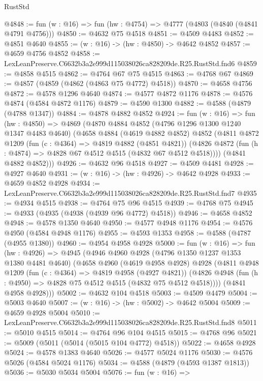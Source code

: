 \begin{lexlean}{RustStd}
\begin{coremodule}
@4848 := fun (w : @16) => fun (hw : @4754) => @4777 (@4803 (@4840 (@4841 @4791 @4756)))
@4850 := @4632 @75 @4518
@4851 := @4509 @4483
@4852 := @4851 @4640
@4855 := (w : @16) -> (hw : @4850) -> @4642 @4852
@4857 := @4659 @4756 @4852
@4858 := LexLeanPreserve.C6632b3a2e999d115038026ca828209de.R25.RustStd.fnd6
@4859 := @4858 @4515
@4862 := @4764 @67 @75 @4515
@4863 := @4768 @67
@4869 := @4857 (@4859 (@4862 (@4863 @75 @4772) @4518))
@4870 := @4658 @4756
@4872 := @4578 @1296 @4640
@4874 := @4577 @4872 @1176
@4878 := @4576 @4874 (@4584 @4872 @1176)
@4879 := @4590 @1300
@4882 := @4588 (@4879 (@4788 @1347))
@4884 := @4878 @4882 @4852
@4924 := fun (w : @16) =>
  fun (hw : @4850) =>
  @4869
    (@4870
      @4884
      @4852
      (@4796 @1296 @1300 @1240 @1347 @4483 @4640)
      (@4658
        @4884
        (@4619 @4882 @4852)
        @4852
        (@4811
          @4872
          @1209
          (fun (c : @4364) => @4819 @4882 (@4851 @4821))
          (@4826 @4872 (fun (h : @4874) => @4828 @67 @4512 @4515 (@4832 @67 @4512 @4518))))
        (@4841 @4882 @4852)))
@4926 := @4632 @96 @4518
@4927 := @4509 @4481
@4928 := @4927 @4640
@4931 := (w : @16) -> (hw : @4926) -> @4642 @4928
@4933 := @4659 @4852 @4928
@4934 := LexLeanPreserve.C6632b3a2e999d115038026ca828209de.R25.RustStd.fnd7
@4935 := @4934 @4515
@4938 := @4764 @75 @96 @4515
@4939 := @4768 @75
@4945 := @4933 (@4935 (@4938 (@4939 @96 @4772) @4518))
@4946 := @4658 @4852
@4948 := @4578 @1350 @4640
@4950 := @4577 @4948 @1176
@4954 := @4576 @4950 (@4584 @4948 @1176)
@4955 := @4593 @1353
@4958 := @4588 (@4787 (@4955 @1380))
@4960 := @4954 @4958 @4928
@5000 := fun (w : @16) =>
  fun (hw : @4926) =>
  @4945
    (@4946
      @4960
      @4928
      (@4796 @1350 @1237 @1353 @1380 @4481 @4640)
      (@4658
        @4960
        (@4619 @4958 @4928)
        @4928
        (@4811
          @4948
          @1209
          (fun (c : @4364) => @4819 @4958 (@4927 @4821))
          (@4826 @4948 (fun (h : @4950) => @4828 @75 @4512 @4515 (@4832 @75 @4512 @4518))))
        (@4841 @4958 @4928)))
@5002 := @4632 @104 @4518
@5003 := @4509 @4479
@5004 := @5003 @4640
@5007 := (w : @16) -> (hw : @5002) -> @4642 @5004
@5009 := @4659 @4928 @5004
@5010 := LexLeanPreserve.C6632b3a2e999d115038026ca828209de.R25.RustStd.fnd8
@5011 := @5010 @4515
@5014 := @4764 @96 @104 @4515
@5015 := @4768 @96
@5021 := @5009 (@5011 (@5014 (@5015 @104 @4772) @4518))
@5022 := @4658 @4928
@5024 := @4578 @1383 @4640
@5026 := @4577 @5024 @1176
@5030 := @4576 @5026 (@4584 @5024 @1176)
@5034 := @4588 (@4879 (@4593 @1387 @1813))
@5036 := @5030 @5034 @5004
@5076 := fun (w : @16) =>

\end{coremodule}
\end{lexlean}
